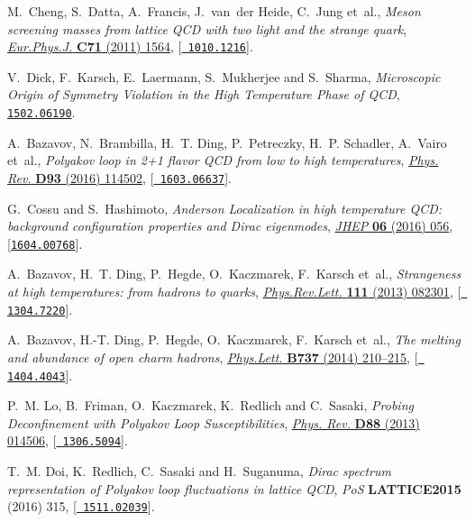 \documentclass{PoS}
\begin{document}
\begin{thebibliography}{100}
M.~Cheng, S.~Datta, A.~Francis, J.~van~der Heide, C.~Jung et~al., \emph{{Meson
  screening masses from lattice QCD with two light and the strange quark}},
  \href{http://dx.doi.org/10.1140/epjc/s10052-011-1564-y}{\emph{Eur.Phys.J.}
  {\bf C71} (2011) 1564}, [\href{https://arxiv.org/abs/1010.1216}{{\tt
  1010.1216}}].

V.~Dick, F.~Karsch, E.~Laermann, S.~Mukherjee and S.~Sharma, \emph{{Microscopic
  Origin of  Symmetry Violation in the High Temperature
  Phase of QCD}},  \href{https://arxiv.org/abs/1502.06190}{{\tt 1502.06190}}.

A.~Bazavov, N.~Brambilla, H.~T. Ding, P.~Petreczky, H.~P. Schadler, A.~Vairo
  et~al., \emph{{Polyakov loop in 2+1 flavor QCD from low to high
  temperatures}},
  \href{http://dx.doi.org/10.1103/PhysRevD.93.114502}{\emph{Phys. Rev.} {\bf
  D93} (2016) 114502}, [\href{https://arxiv.org/abs/1603.06637}{{\tt
  1603.06637}}].

G.~Cossu and S.~Hashimoto, \emph{{Anderson Localization in high temperature
  QCD: background configuration properties and Dirac eigenmodes}},
  \href{http://dx.doi.org/10.1007/JHEP06(2016)056}{\emph{JHEP} {\bf 06} (2016)
  056}, [\href{https://arxiv.org/abs/1604.00768}{{\tt 1604.00768}}].

A.~Bazavov, H.~T. Ding, P.~Hegde, O.~Kaczmarek, F.~Karsch et~al.,
  \emph{{Strangeness at high temperatures: from hadrons to quarks}},
  \href{http://dx.doi.org/10.1103/PhysRevLett.111.082301}{\emph{Phys.Rev.Lett.}
  {\bf 111} (2013) 082301}, [\href{https://arxiv.org/abs/1304.7220}{{\tt
  1304.7220}}].

A.~Bazavov, H.-T. Ding, P.~Hegde, O.~Kaczmarek, F.~Karsch et~al., \emph{{The
  melting and abundance of open charm hadrons}},
  \href{http://dx.doi.org/10.1016/j.physletb.2014.08.034}{\emph{Phys.Lett.}
  {\bf B737} (2014) 210--215}, [\href{https://arxiv.org/abs/1404.4043}{{\tt
  1404.4043}}].

P.~M. Lo, B.~Friman, O.~Kaczmarek, K.~Redlich and C.~Sasaki, \emph{{Probing
  Deconfinement with Polyakov Loop Susceptibilities}},
  \href{http://dx.doi.org/10.1103/PhysRevD.88.014506}{\emph{Phys. Rev.} {\bf
  D88} (2013) 014506}, [\href{https://arxiv.org/abs/1306.5094}{{\tt
  1306.5094}}].

T.~M. Doi, K.~Redlich, C.~Sasaki and H.~Suganuma, \emph{{Dirac spectrum
  representation of Polyakov loop fluctuations in lattice QCD}}, {\emph{PoS}
  {\bf LATTICE2015} (2016) 315}, [\href{https://arxiv.org/abs/1511.02039}{{\tt
  1511.02039}}].


\end{thebibliography}
\end{document}
